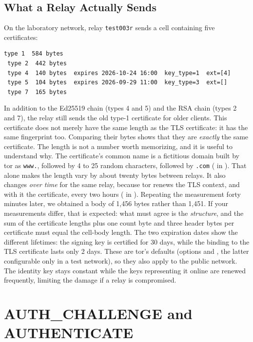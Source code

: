 \subsection{What a Relay Actually Sends}

On the laboratory network, relay \texttt{test003r} sends a  cell containing five certificates:
\begin{lstlisting}[numbers=none]
 type 1  584 bytes
 type 2  442 bytes
 type 4  140 bytes  expires 2026-10-24 16:00  key_type=1  ext=[4]
 type 5  104 bytes  expires 2026-09-29 11:00  key_type=3  ext=[]
 type 7  165 bytes
\end{lstlisting}
In addition to the Ed25519 chain (types 4 and 5) and the RSA chain (types 2 and 7), the relay still sends the old type-1 certificate for older clients. This certificate does not merely have the same length as the TLS certificate: it has the same fingerprint too. Comparing their bytes shows that they are \emph{exactly} the same certificate. The length is not a number worth memorizing, and it is useful to understand why. The certificate's common name is a fictitious domain built by tor as \texttt{www.}, followed by 4 to 25 random characters, followed by \texttt{.com} ( in ). That alone makes the length vary by about twenty bytes between relays. It also changes \emph{over time} for the same relay, because tor renews the TLS context, and with it the certificate, every two hours ( in ). Repeating the measurement forty minutes later, we obtained a  body of 1,456 bytes rather than 1,451. If your measurements differ, that is expected: what must agree is the \emph{structure}, and the sum of the certificate lengths plus one count byte and three header bytes per certificate must equal the cell-body length. The two expiration dates show the different lifetimes: the signing key is certified for 30 days, while the binding to the TLS certificate lasts only 2 days. These are tor's defaults (options  and , the latter configurable only in a test network), so they also apply to the public network. The identity key stays constant while the keys representing it online are renewed frequently, limiting the damage if a relay is compromised.

\section{AUTH\_CHALLENGE and AUTHENTICATE}\label{sec:canale-authenticate}

